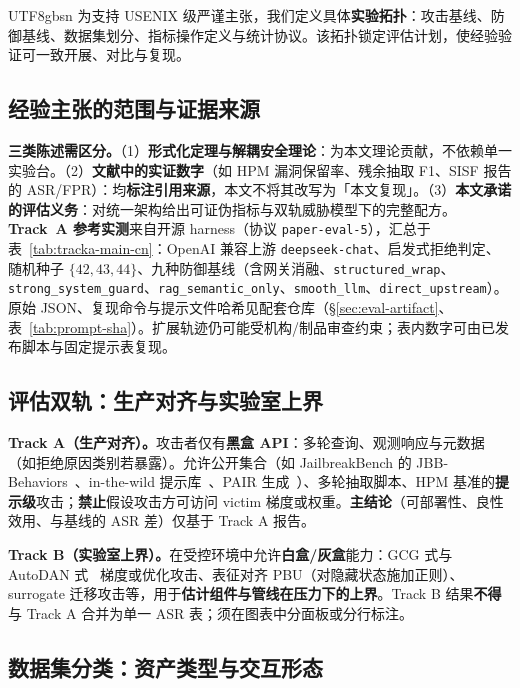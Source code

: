 \documentclass[letterpaper,twocolumn,10pt]{article}
\begin{document}
\begin{CJK}{UTF8}{gbsn}
为支持 USENIX 级严谨主张，我们定义具体\textbf{实验拓扑}：攻击基线、防御基线、数据集划分、指标操作定义与统计协议。该拓扑锁定评估计划，使经验验证可一致开展、对比与复现。

\subsection{经验主张的范围与证据来源}
\label{sec:eval-scope}

\textbf{三类陈述需区分。}（1）\textbf{形式化定理与解耦安全理论}：为本文理论贡献，不依赖单一实验台。（2）\textbf{文献中的实证数字}（如 HPM 漏洞保留率、残余抽取 F1、SISF 报告的 ASR/FPR）：均\textbf{标注引用来源}，本文不将其改写为「本文复现」。（3）\textbf{本文承诺的评估义务}：对统一架构给出可证伪指标与双轨威胁模型下的完整配方。\textbf{Track~A 参考实测}来自开源 harness（协议 \texttt{paper-eval-5}），汇总于表~\ref{tab:tracka-main-cn}：OpenAI 兼容上游 \texttt{deepseek-chat}、启发式拒绝判定、随机种子 $\{42,43,44\}$、九种防御基线（含网关消融、\texttt{structured\_wrap}、\texttt{strong\_system\_guard}、\texttt{rag\_semantic\_only}、\texttt{smooth\_llm}、\texttt{direct\_upstream}）。原始 JSON、复现命令与提示文件哈希见配套仓库（\S\ref{sec:eval-artifact}、表~\ref{tab:prompt-sha}）。扩展轨迹仍可能受机构/制品审查约束；表内数字可由已发布脚本与固定提示表复现。

\subsection{评估双轨：生产对齐与实验室上界}
\label{sec:eval-tracks}

\textbf{Track A（生产对齐）。}攻击者仅有\textbf{黑盒 API}：多轮查询、观测响应与元数据（如拒绝原因类别若暴露）。允许公开集合（如 JailbreakBench 的 JBB-Behaviors~\cite{jailbreakbench}、in-the-wild 提示库~\cite{wild-jailbreak-prompts}、PAIR 生成~\cite{pair-jailbreak}）、多轮抽取脚本、HPM 基准的\textbf{提示级}攻击；\textbf{禁止}假设攻击方可访问 victim 梯度或权重。\textbf{主结论}（可部署性、良性效用、与基线的 ASR 差）仅基于 Track A 报告。

\textbf{Track B（实验室上界）。}在受控环境中允许\textbf{白盒/灰盒}能力：GCG 式与 AutoDAN 式~\cite{gcg,autodan} 梯度或优化攻击、表征对齐 PBU（对隐藏状态施加正则）、surrogate 迁移攻击等，用于\textbf{估计组件与管线在压力下的上界}。Track B 结果\textbf{不得}与 Track A 合并为单一 ASR 表；须在图表中分面板或分行标注。

\subsection{数据集分类：资产类型与交互形态}
\label{sec:eval-taxonomy}


\end{CJK}
\end{document}
